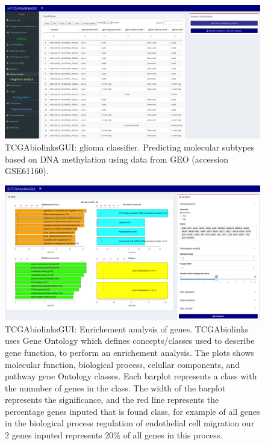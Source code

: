   \begin{figure}[h!]
  \centering
  \includegraphics[width=1.0\textwidth]{images/glioma_classifier.pdf}
  \caption{TCGAbiolinksGUI: glioma classifier. Predicting molecular subtypes based on DNA methylation using data from GEO (accession GSE61160).}
  \label{fig:glioma}
   \end{figure}

\begin{figure}
\includegraphics[width=1.0\linewidth]{images/gui_ea.png}
\caption[TCGAbiolinksGUI: Enrichement analysis of genes]{TCGAbiolinksGUI: Enrichement analysis of genes.
 TCGAbiolinks uses Gene Ontology which defines concepts/classes used to describe gene function, to perform an enrichement analysis. The plots shows  molecular function, biological process, celullar components, and pathway gene Ontology classes.
 Each barplot represents a class with the numnber of genes in the class. The width of the barplot represents the significance, and the red line represents the percentage genes inputed that is found class, for example of all genes in the biological process regulation of endothelial cell migration our 2 genes inputed represents 20\% of all genes in this process.}
\label{fig:gui_ea}
\end{figure}


